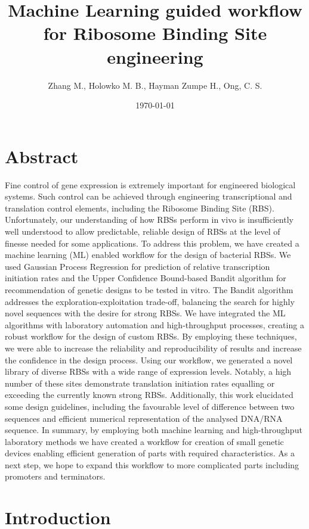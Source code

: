 \documentclass{article}
\title{Machine Learning guided workflow for Ribosome Binding Site engineering}
\author{Zhang M., Holowko M. B., Hayman Zumpe H., Ong, C. S.}
\date{\today{}}
\begin{document}
\maketitle

\section{Abstract}

Fine control of gene expression is extremely important for engineered biological systems.
Such control can be achieved through engineering transcriptional and translation control elements, including the Ribosome Binding Site (RBS).
Unfortunately, our understanding of how RBSs perform in vivo is insufficiently well understood to allow predictable, reliable design of RBSs at the level of finesse needed for some applications.
To address this problem, we have created a machine learning (ML) enabled workflow for the design of bacterial RBSs.
We used Gaussian Process Regression for prediction of relative transcription initiation rates and the Upper Confidence Bound-based Bandit algorithm for recommendation of genetic designs to be tested in vitro.
The Bandit algorithm addresses the exploration-exploitation trade-off, balancing the search for highly novel sequences with the desire for strong RBSs.
We have integrated the ML algorithms with laboratory automation and high-throughput processes, creating a robust workflow for the design of custom RBSs.
By employing these techniques, we were able to increase the reliability and reproducibility of results and increase the confidence in the design process.
Using our workflow, we generated a novel library of diverse RBSs with a wide range of expression levels.
Notably, a high number of these sites demonstrate translation initiation rates equalling or exceeding the currently known strong RBSs.
Additionally, this work elucidated some design guidelines, including the favourable level of difference between two sequences and efficient numerical representation of the analysed DNA/RNA sequence.
In summary, by employing both machine learning and high-throughput laboratory methods we have created a workflow for creation of small genetic devices enabling efficient generation of parts with required characteristics.
As a next step, we hope to expand this workflow to more complicated parts including promoters and terminators. 


\section{Introduction}
\end{document}
